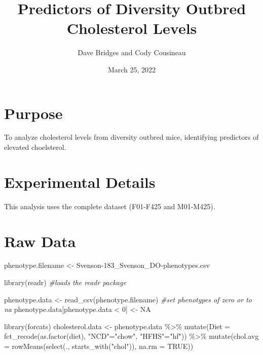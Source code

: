 \documentclass[
]{article}
\title{Predictors of Diversity Outbred Cholesterol Levels}
\author{Dave Bridges and Cody Cousineau}
\date{March 25, 2022}
\newenvironment{Shaded}{\begin{snugshade}}{\end{snugshade}}
\newcommand{\AttributeTok}[1]{\textcolor[rgb]{0.77,0.63,0.00}{#1}}
\newcommand{\CommentTok}[1]{\textcolor[rgb]{0.56,0.35,0.01}{\textit{#1}}}
\newcommand{\ConstantTok}[1]{\textcolor[rgb]{0.00,0.00,0.00}{#1}}
\newcommand{\DecValTok}[1]{\textcolor[rgb]{0.00,0.00,0.81}{#1}}
\newcommand{\FunctionTok}[1]{\textcolor[rgb]{0.00,0.00,0.00}{#1}}
\newcommand{\NormalTok}[1]{#1}
\newcommand{\OtherTok}[1]{\textcolor[rgb]{0.56,0.35,0.01}{#1}}
\newcommand{\SpecialCharTok}[1]{\textcolor[rgb]{0.00,0.00,0.00}{#1}}
\newcommand{\StringTok}[1]{\textcolor[rgb]{0.31,0.60,0.02}{#1}}
\begin{document}
\maketitle

{
\setcounter{tocdepth}{2}
\tableofcontents
}
\hypertarget{purpose}{%
\section{Purpose}\label{purpose}}

To analyze cholesterol levels from diversity outbred mice, identifying
predictors of elevated choelsterol.

\hypertarget{experimental-details}{%
\section{Experimental Details}\label{experimental-details}}

This analysis uses the complete dataset (F01-F425 and M01-M425).

\hypertarget{raw-data}{%
\section{Raw Data}\label{raw-data}}

\begin{Shaded}
\begin{Highlighting}[]
\NormalTok{phenotype.filename }\OtherTok{\textless{}{-}} \StringTok{\textquotesingle{}Svenson{-}183\_Svenson\_DO{-}phenotypes.csv\textquotesingle{}}
\end{Highlighting}
\end{Shaded}

\begin{Shaded}
\begin{Highlighting}[]
\FunctionTok{library}\NormalTok{(readr) }\CommentTok{\#loads the readr package}


\NormalTok{phenotype.data }\OtherTok{\textless{}{-}} \FunctionTok{read\_csv}\NormalTok{(phenotype.filename)}
\CommentTok{\#set phenotypes of zero or  to na}
\NormalTok{phenotype.data[phenotype.data }\SpecialCharTok{\textless{}} \DecValTok{0}\NormalTok{] }\OtherTok{\textless{}{-}} \ConstantTok{NA}

\FunctionTok{library}\NormalTok{(forcats)}
\NormalTok{cholesterol.data }\OtherTok{\textless{}{-}}
\NormalTok{  phenotype.data }\SpecialCharTok{\%\textgreater{}\%}
  \FunctionTok{mutate}\NormalTok{(}\AttributeTok{Diet =} \FunctionTok{fct\_recode}\NormalTok{(}\FunctionTok{as.factor}\NormalTok{(diet),}
                           \StringTok{"NCD"}\OtherTok{=}\StringTok{"chow"}\NormalTok{,}
                           \StringTok{"HFHS"}\OtherTok{=}\StringTok{"hf"}\NormalTok{)) }\SpecialCharTok{\%\textgreater{}\%}
  \FunctionTok{mutate}\NormalTok{(}\AttributeTok{chol.avg =} \FunctionTok{rowMeans}\NormalTok{(}\FunctionTok{select}\NormalTok{(., }\FunctionTok{starts\_with}\NormalTok{(}\StringTok{"chol"}\NormalTok{)), }
                             \AttributeTok{na.rm =} \ConstantTok{TRUE}\NormalTok{))}
\end{Highlighting}
\end{Shaded}
\end{document}
